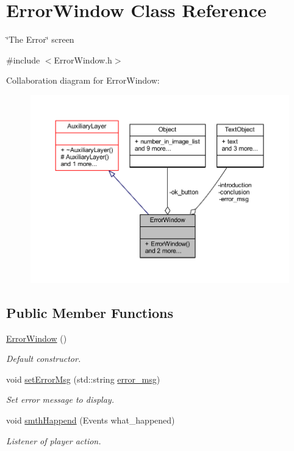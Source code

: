 \hypertarget{class_error_window}{}\section{Error\+Window Class Reference}
\label{class_error_window}


\char`\"{}\+The Error\char`\"{} screen  




{\ttfamily \#include $<$Error\+Window.\+h$>$}



Collaboration diagram for Error\+Window\+:\nopagebreak
\begin{figure}[H]
\begin{center}
\leavevmode
\includegraphics[width=350pt]{class_error_window__coll__graph}
\end{center}
\end{figure}
\subsection*{Public Member Functions}
\begin{DoxyCompactItemize}
\item 
\mbox{\label{class_error_window_a6a1f634d7aab03610249b4988f374314}} 
\hyperlink{class_error_window_a6a1f634d7aab03610249b4988f374314}{Error\+Window} ()
\begin{DoxyCompactList}\small\item\em Default constructor. \end{DoxyCompactList}\item 
void \hyperlink{class_error_window_ac5adc252881ca2932b4804a51da44d3e}{set\+Error\+Msg} (std\+::string \hyperlink{class_error_window_ad282b1abbf57a6c004b1ccfa48355f49}{error\+\_\+msg})
\begin{DoxyCompactList}\small\item\em Set error message to display. \end{DoxyCompactList}\item 
void \hyperlink{class_error_window_af9096dfdd53c4e788e62ce543f939f01}{smth\+Happend} (Events what\+\_\+happened)
\begin{DoxyCompactList}\small\item\em Listener of player action. \end{DoxyCompactList}\end{DoxyCompactItemize}
